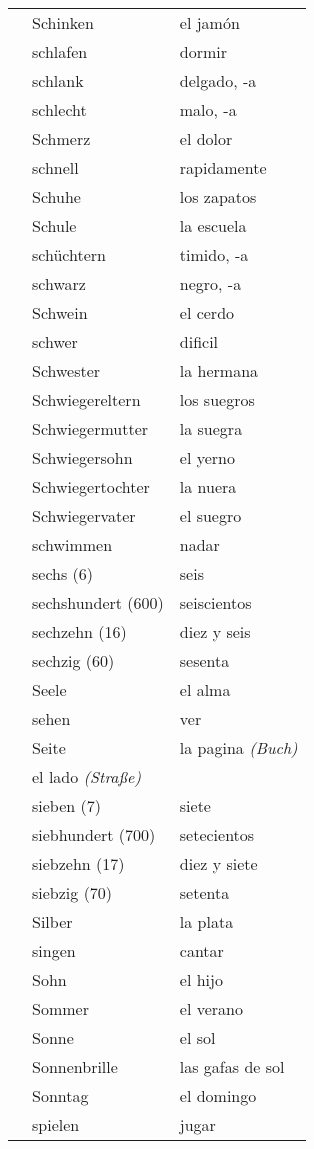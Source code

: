 \documentclass{spanish_summary}
\begin{document}
\begin{longtable}{p{} p{} | p{}}
& Schinken & el jamón \\
& schlafen & dormir  \\
& schlank & delgado, -a \\
& schlecht & malo, -a \\
& Schmerz & el dolor  \\
& schnell & rapidamente  \\
& Schuhe & los zapatos  \\
& Schule & la escuela  \\
& schüchtern & timido, -a\\
& schwarz & negro, -a  \\
& Schwein & el cerdo \\
& schwer & dificil  \\
& Schwester & la hermana  \\
& Schwiegereltern & los suegros  \\
& Schwiegermutter & la suegra  \\
& Schwiegersohn & el yerno  \\
& Schwiegertochter & la nuera  \\
& Schwiegervater & el suegro  \\
& schwimmen & nadar  \\
& sechs (6) & seis  \\
& sechshundert (600) & seiscientos   \\
& sechzehn (16) & diez y seis  \\
& sechzig (60) & sesenta  \\
& Seele & el alma  \\
& sehen & ver \\
& Seite & la pagina \textit{(Buch)} \\
& el lado \textit{(Straße)} \\
& sieben (7) & siete  \\
& siebhundert (700) & setecientos  \\
& siebzehn (17) & diez y siete  \\
& siebzig (70) & setenta  \\
& Silber & la plata  \\
& singen & cantar  \\
& Sohn & el hijo  \\
& Sommer & el verano  \\
& Sonne & el sol  \\
& Sonnenbrille & las gafas de sol \\
& Sonntag & el domingo  \\
& spielen & jugar  \\

\end{longtable}
\end{document}
